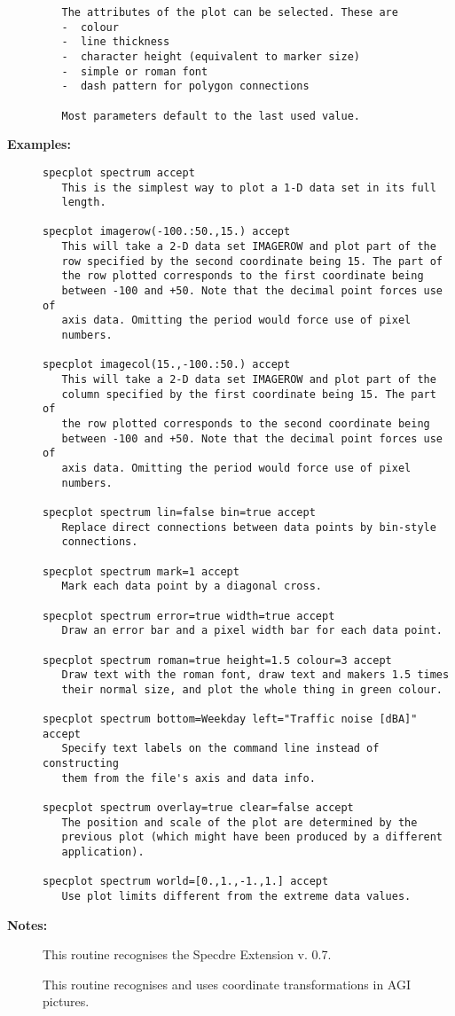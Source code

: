 \begin{description}
\begin{verbatim}
   The attributes of the plot can be selected. These are
   -  colour
   -  line thickness
   -  character height (equivalent to marker size)
   -  simple or roman font
   -  dash pattern for polygon connections

   Most parameters default to the last used value.
\end{verbatim}

\item [{\bf Examples:}]
\begin{verbatim}
specplot spectrum accept
   This is the simplest way to plot a 1-D data set in its full
   length.

specplot imagerow(-100.:50.,15.) accept
   This will take a 2-D data set IMAGEROW and plot part of the
   row specified by the second coordinate being 15. The part of
   the row plotted corresponds to the first coordinate being
   between -100 and +50. Note that the decimal point forces use of
   axis data. Omitting the period would force use of pixel
   numbers.

specplot imagecol(15.,-100.:50.) accept
   This will take a 2-D data set IMAGEROW and plot part of the
   column specified by the first coordinate being 15. The part of
   the row plotted corresponds to the second coordinate being
   between -100 and +50. Note that the decimal point forces use of
   axis data. Omitting the period would force use of pixel
   numbers.

specplot spectrum lin=false bin=true accept
   Replace direct connections between data points by bin-style
   connections.

specplot spectrum mark=1 accept
   Mark each data point by a diagonal cross.

specplot spectrum error=true width=true accept
   Draw an error bar and a pixel width bar for each data point.

specplot spectrum roman=true height=1.5 colour=3 accept
   Draw text with the roman font, draw text and makers 1.5 times
   their normal size, and plot the whole thing in green colour.

specplot spectrum bottom=Weekday left="Traffic noise [dBA]" accept
   Specify text labels on the command line instead of constructing
   them from the file's axis and data info.

specplot spectrum overlay=true clear=false accept
   The position and scale of the plot are determined by the
   previous plot (which might have been produced by a different
   application).

specplot spectrum world=[0.,1.,-1.,1.] accept
   Use plot limits different from the extreme data values.
\end{verbatim}

\item [{\bf Notes:}]
This routine recognises the Specdre Extension v. 0.7.

This routine recognises and uses coordinate transformations in
AGI pictures.
\end{description}

